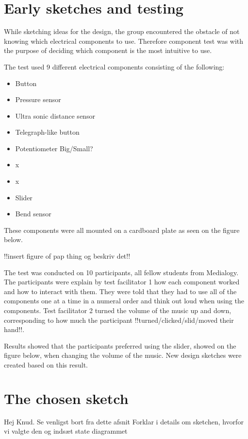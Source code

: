 
\section{Early sketches and testing}
While sketching ideas for the design, the group encountered the obstacle of not knowing which electrical components to use. Therefore component test was with the purpose of deciding which component is the most intuitive to use. 

The test used 9 different electrical components consisting of the following:
\begin{itemize}
\item Button
\item Pressure sensor
\item Ultra sonic distance sensor
\item Telegraph-like button
\item Potentiometer Big/Small?
\item x
\item x
\item Slider
\item Bend sensor
\end{itemize}

These components were all mounted on a cardboard plate as seen on the figure below.

!!insert figure of pap thing og beskriv det!!

The test was conducted on 10 participants, all fellow students from Medialogy. The participants were explain by test facilitator 1 how each component worked and how to interact with them. They were told that they had to use all of the components one at a time in a numeral order and think out loud when using the components. Test facilitator 2 turned the volume of the music up and down, corresponding to how much the participant !!turned/clicked/slid/moved their hand!!.

Results showed that the participants preferred using the slider, showed on the figure below, when changing the volume of the music. New design sketches were created based on this result.

\section{The chosen sketch}
Hej Knud. Se venligst bort fra dette afsnit
Forklar i details om sketchen, hvorfor vi valgte den og indsæt state diagrammet


